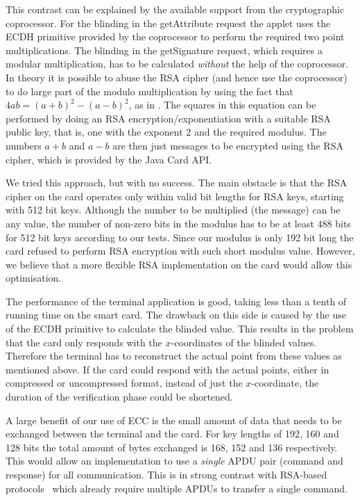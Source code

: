 This contrast can be explained by the available support from the
cryptographic coprocessor. For the blinding in the
\textsf{getAttribute} request the applet uses the ECDH primitive
provided by the coprocessor to perform the required two point
multiplications. The blinding in the \textsf{getSignature} request,
which requires a modular multiplication, has to be calculated
\emph{without} the help of the coprocessor.  In theory it is possible
to abuse the RSA cipher (and hence use the coprocessor) to do large
part of the modulo multiplication by using the fact that $4ab =
(a+b)^2 - (a-b)^2$, as in \cite{Sterckx09,TewsJacobs09}. The squares in this
equation can be performed by
doing an RSA encryption\slash exponentiation with a suitable RSA public
key, that is, one with the exponent 2 and the required modulus. The
numbers $a+b$ and $a-b$ are then just messages to be encrypted using
the RSA cipher, which is provided by the Java Card API.

We tried this approach, but with no success. The main obstacle is that
the RSA cipher on the card operates only within valid bit lengths for
RSA keys, starting with 512 bit keys. Although the number to be
multiplied (the message) can be any value, the number of non-zero bits
in the modulus has to be at least 488 bits for 512 bit keys according
to our tests. Since our modulus is only 192 bit long the card refused
to perform RSA encryption with such short modulus value. However, we
believe that a more flexible RSA implementation on the card would
allow this optimisation.

The performance of the terminal application is good, taking less than
a tenth of running time on the smart card. The drawback on this side is
caused by the use of the ECDH primitive to calculate the blinded value. This
results in the problem that the card only responds with the $x$-coordinates
of the blinded values. Therefore the terminal has to reconstruct the actual
point from these values as mentioned above. If the card could respond with
the actual points, either in compressed or uncompressed format, instead of
just the $x$-coordinate, the duration of the verification phase could be
shortened.

A large benefit of our use of ECC is the small amount of data that needs to be
exchanged between the terminal and the card. For key lengths of 192, 160 and 128
bits the total amount of bytes exchanged is 168, 152 and 136 respectively. This
would allow an implementation to use a \emph{single} APDU pair (command and
response) for all communication. This is in strong contrast with RSA-based
protocols~\cite{Sterckx09,TewsJacobs09} which already require multiple APDUs to
transfer a single command.


